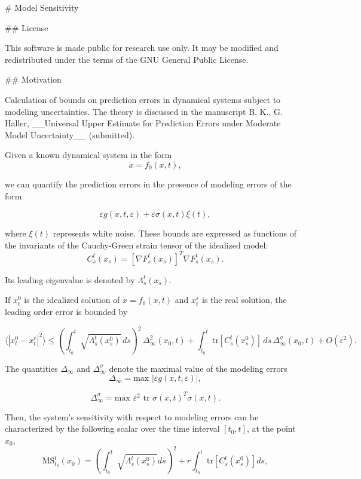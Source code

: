 # Model Sensitivity


## License

This software is made public for research use only. It may be modified and redistributed under the terms of the GNU General Public License.



## Motivation

Calculation of bounds on prediction errors in dynamical systems subject to modeling uncertainties. 
The theory is discussed in the manuscript B. K., G. Haller, __Universal Upper Estimate for Prediction Errors under Moderate Model Uncertainty__ (submitted).

Given a known dynamical system in the form 
\begin{equation}
\dot{x} = f_0(x,t),
\end{equation}

we can quantify the prediction errors in the presence of modeling errors of the form

$$
\varepsilon g(x,t,\varepsilon) + \varepsilon \sigma(x,t) \xi(t),
$$

where $\xi(t)$ represents white noise. These bounds are expressed as functions of the invariants of the Cauchy-Green strain tensor of the idealized model:
$$
C_s^t(x_s) = \left[\nabla F_s^t(x_s)\right]^T\nabla F_s^t(x_s).
$$

Its leading eigenvalue is denoted by $\Lambda_s^t(x_s)$.

If $x^0_t$ is the idealized solution of $\dot{x}=f_0(x,t)$ and $x^\varepsilon_t$ is the real solution, the leading order error is bounded by

$$
\langle |x^0_t - x^\varepsilon_t|^2\rangle \leq  \left(\int_{t_{0}}^{t}\sqrt{\Lambda_{s}^{t}\left(x^0_{s}\right)}\,ds\right)^{2}\,\Delta_{\infty}^{2}(x_{0},t)+\int_{t_{0}}^{t}\mathrm{tr}\left[C_{s}^{t}\left(x^0_{s}\right)\right]\,ds\,\Delta_{\infty}^{\sigma}(x_{0},t) + O(\varepsilon^2).
$$

The quantities $\Delta_{\infty}$ and $\Delta_{\infty}^{\sigma}$ denote the maximal value of the modeling errors 
$$
\Delta_{\infty} = \text{max } |\varepsilon g(x,t,\varepsilon)|,
$$

$$
\Delta_{\infty}^\sigma = \text{max } \varepsilon^2 \text{ tr } \sigma(x,t)^T\sigma(x,t).
$$

Then, the system's sensitivity with respect to modeling errors can be characterized by the following scalar over the time interval $[t_0,t]$, at the point $x_0$, 
$$
\text{MS}_{t_0}^t(x_0) = \left( \int_{t_0}^t \sqrt{\Lambda_s^t\left(x^0_s\right)}ds\right)^2 + r \int_{t_0}^t \text{tr}[C_s^t\left(x^0_s\right)]ds,
$$


